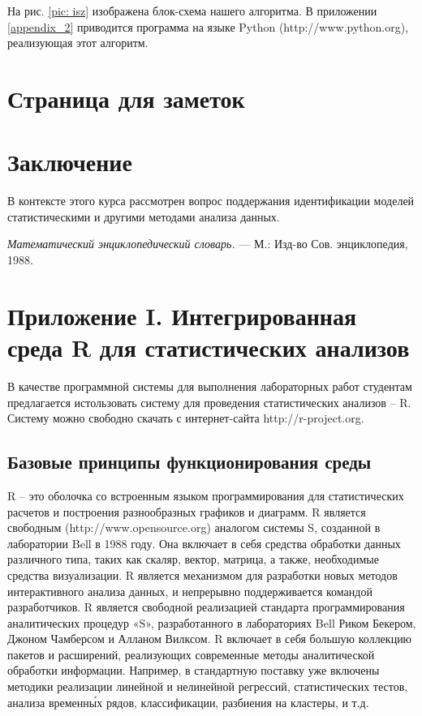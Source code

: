 \documentclass[12pt, openany, twoside]{book} %
\begin{document}
На рис. \ref{pic: isz} изображена блок-схема нашего алгоритма. В приложении \ref{appendix_2} приводится программа на языке Python (http://www.python.org), реализующая этот алгоритм. 
 
\chapter*{Страница для заметок}

\chapter*{Заключение}


В контексте этого курса рассмотрен вопрос поддержания идентификации моделей статистическими и другими методами анализа данных.


\begin{thebibliography}{99}
 \emph{Математический энциклопедический словарь.} ---
М.: Изд-во Сов. энциклопедия, 1988.
\end{thebibliography}
\chapter*{Приложение I. Интегрированная среда R для статистических анализов}

В качестве программной системы для выполнения лабораторных работ студентам предлагается истользовать систему для проведения статистических анализов – R. Систему можно свободно скачать с интернет-сайта http://r-project.org. 

\section{Базовые принципы функционирования среды}

R – это оболочка со встроенным языком программирования для статистических расчетов и построения разнообразных графиков и диаграмм. R является свободным (http://www.opensource.org) аналогом системы S, созданной в лаборатории Bell в 1988 году. Она включает в себя средства обработки данных различного типа, таких как скаляр, вектор, матрица, а также, необходимые средства визуализации. R является механизмом для разработки новых методов интерактивного анализа данных, и непрерывно поддерживается командой разработчиков. R является свободной реализацией стандарта программирования аналитических процедур «S», разработанного в лабораториях Bell Риком Бекером, Джоном Чамберсом и Алланом Вилксом. R включает в себя большую коллекцию пакетов и расширений, реализующих современные методы аналитической обработки информации. Например, в стандартную поставку уже включены методики реализации линейной и нелинейной регрессий, статистических тестов, анализа временн\'ых рядов, классификации, разбиения на кластеры, и т.д.
\end{document}

